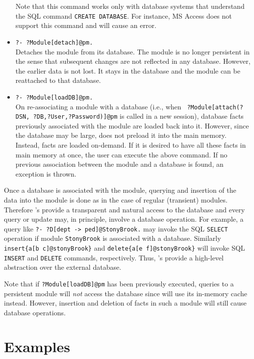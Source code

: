 \begin{itemize}
  Note that this command works only with database systems that understand
  the SQL command {\tt CREATE DATABASE}. For instance, MS Access does not
  support this command and will cause an error.
\item {\tt ?- ?Module[detach]@pm.}\\
  Detaches the module from its database. The module is no longer persistent
  in the sense that subsequent changes are not reflected in any database.
  However, the earlier data is not lost. It stays in the database and the
  module can be reattached to that database.
\item {\tt ?- ?Module[loadDB]@pm.}\\
  On re-associating a module with a database (i.e., when {\tt
    ?Module[attach(?DSN, ?DB,?User,?Password)]@pm} is called in a new
  \FLSYSTEM session), database facts previously associated with the module are
  loaded back into it.  However, since the database may be large, \FLSYSTEM
  does not preload it into the main memory. Instead, facts are loaded
  on-demand.  If it is desired to have all these facts in main
  memory at once, the user can execute the above command. If no previous
  association between the module and a database is found, an exception is
  thrown.
\end{itemize}



Once a database is associated with the module, querying and insertion of
the data into the module is done as in the case of regular (transient)
modules.  Therefore \psm's provide a transparent and natural access to the
database and every query or update may, in principle, involve a database
operation.  For example, a query like {\tt ?- ?D[dept -> ped]@StonyBrook.}
may invoke the SQL {\tt SELECT} operation if module {\tt StonyBrook} is
associated with a database.  Similarly {\tt  insert\{a[b \fd
  c]@stonyBrook\}} and {\tt delete\{a[e \fd f]@stonyBrook\}}  will invoke
SQL {\tt INSERT} and {\tt DELETE} commands, respectively. Thus, \psm's provide
a high-level abstraction over the external database.

Note that if {\tt ?Module[loadDB]@pm} has been previously executed,
queries to a persistent module will \emph{not} access the database since
\FLSYSTEM will use its in-memory cache instead. However, insertion and
deletion of facts in such a module will still cause database operations.

\section{Examples}

